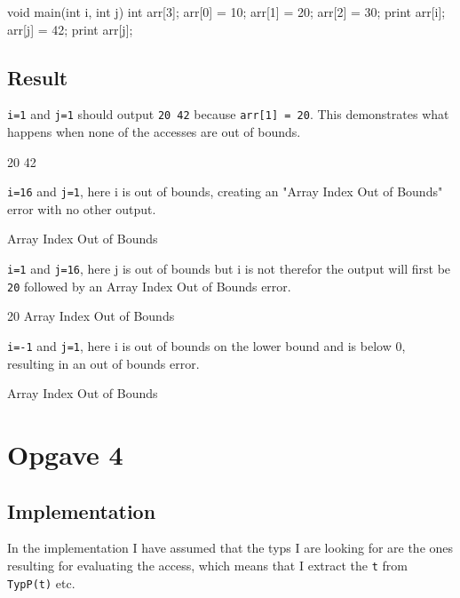 \begin{ccode}
void main(int i, int j) {
    int arr[3];
    arr[0] = 10;
    arr[1] = 20;
    arr[2] = 30;
    print arr[i];
    arr[j] = 42;
    print arr[j];
}
\end{ccode}
\subsection{Result}
\texttt{i=1} and \texttt{j=1} should output \texttt{20 42} because
\texttt{arr[1] = 20}. This demonstrates what happens when none of the accesses
are out of bounds.
\begin{bashcode}
20 42 
\end{bashcode}
\texttt{i=16} and \texttt{j=1}, here i is out of bounds, creating an "Array
Index Out of Bounds" error with no other output.
\begin{bashcode}
Array Index Out of Bounds
\end{bashcode}
\texttt{i=1} and \texttt{j=16}, here j is out of bounds but i is not therefor the output will
first be \texttt{20} followed by an Array Index Out of Bounds error.
\begin{bashcode}
20 Array Index Out of Bounds
\end{bashcode}

\texttt{i=-1} and \texttt{j=1}, here i is out of bounds on the lower bound and
is below 0, resulting in an out of bounds error.
\begin{bashcode}
Array Index Out of Bounds
\end{bashcode}

\section{Opgave 4}
\subsection{Implementation}
In the implementation I have assumed that the typs I are looking for are the
ones resulting for evaluating the access, which means that I extract the
\texttt{t} from \texttt{TypP(t)} etc.

